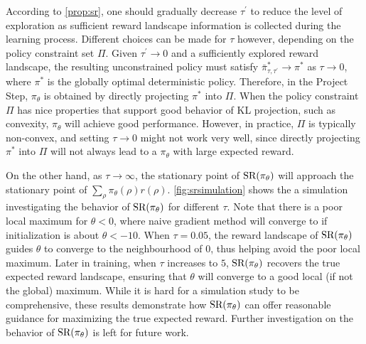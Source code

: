 According to \cref{prop:sr}, one should gradually decrease $\tau^{\prime}$
to reduce the level of exploration as sufficient reward landscape information
is collected during the learning process.
Different choices can be made for $\tau$ however,
depending on the policy constraint set $\Pi$.
Given $\tau^{\prime} \to 0$ and a sufficiently explored reward landscape,
the resulting unconstrained policy must satisfy
$\bar{\pi}_{\tau,\tau^{\prime}}^* \to \pi^*$ as $\tau \to 0$,
where $\pi^*$ is the globally optimal deterministic policy. 
Therefore, in the Project Step, $\pi_\theta$ is obtained by directly
projecting $\pi^*$ into $\Pi$.
When the policy constraint $\Pi$ has nice properties
that support good behavior of KL projection,
such as convexity,
$\pi_\theta$ will achieve good performance.
However, in practice, $\Pi$ is typically non-convex,
and setting $\tau \to 0$ might not work very well,
since directly projecting $\pi^*$ into $\Pi$ will not always lead to
a $\pi_\theta$ with large expected reward.



On the other hand, as $\tau \to \infty$,
the stationary point of $\text{SR}(\pi_\theta)$ will approach the
stationary point of $\sum_{\rho}{ \pi_\theta(\rho) r(\rho) }$.
\cref{fig:srsimulation} shows the a simulation
investigating the behavior of $\text{SR}(\pi_\theta)$ for different $\tau$.
Note that there is a poor local maximum for $\theta <0$,
where naive gradient method will converge to if initialization is
about $\theta < -10$. 
When $\tau = 0.05$, the reward landscape of $\text{SR}(\pi_\theta)$ guides
$\theta$ to converge to the neighbourhood of $0$,
thus helping avoid the poor local maximum.
Later in training, when $\tau$ increases to $5$,
$\text{SR}(\pi_\theta)$ recovers the true expected reward landscape,
ensuring that $\theta$ will converge to a good local (if not the global)
maximum.
While it is hard for a simulation study to be comprehensive,
these results demonstrate how $\text{SR}(\pi_\theta)$ can offer reasonable guidance
for maximizing the true expected reward.
Further investigation on the behavior of $\text{SR}(\pi_\theta)$
is left for future work.
 
